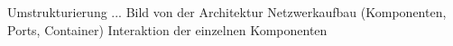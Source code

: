 Umstrukturierung
...
Bild von der Architektur
Netzwerkaufbau (Komponenten, Ports, Container)
Interaktion der einzelnen Komponenten
